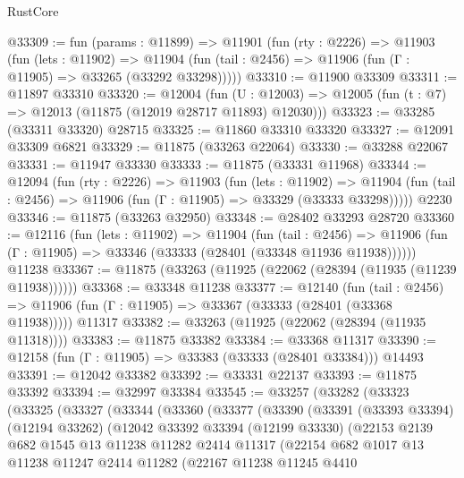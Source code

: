 \begin{lexlean}{RustCore}
\begin{coremodule}
@33309 := fun (params : @11899) =>
  @11901
    (fun (rty : @2226) =>
    @11903
      (fun (lets : @11902) =>
      @11904 (fun (tail : @2456) => @11906 (fun (Γ : @11905) => @33265 (@33292 @33298)))))
@33310 := @11900 @33309
@33311 := @11897 @33310
@33320 := @12004
    (fun (U : @12003) => @12005 (fun (t : @7) => @12013 (@11875 (@12019 @28717 @11893) @12030)))
@33323 := @33285 (@33311 @33320) @28715
@33325 := @11860 @33310 @33320
@33327 := @12091 @33309 @6821
@33329 := @11875 (@33263 @22064)
@33330 := @33288 @22067
@33331 := @11947 @33330
@33333 := @11875 (@33331 @11968)
@33344 := @12094
    (fun (rty : @2226) =>
    @11903
      (fun (lets : @11902) =>
      @11904 (fun (tail : @2456) => @11906 (fun (Γ : @11905) => @33329 (@33333 @33298)))))
    @2230
@33346 := @11875 (@33263 @32950)
@33348 := @28402 @33293 @28720
@33360 := @12116
    (fun (lets : @11902) =>
    @11904
      (fun (tail : @2456) =>
      @11906 (fun (Γ : @11905) => @33346 (@33333 (@28401 (@33348 @11936 @11938))))))
    @11238
@33367 := @11875 (@33263 (@11925 (@22062 (@28394 (@11935 (@11239 @11938))))))
@33368 := @33348 @11238
@33377 := @12140
    (fun (tail : @2456) => @11906 (fun (Γ : @11905) => @33367 (@33333 (@28401 (@33368 @11938)))))
    @11317
@33382 := @33263 (@11925 (@22062 (@28394 (@11935 @11318))))
@33383 := @11875 @33382
@33384 := @33368 @11317
@33390 := @12158 (fun (Γ : @11905) => @33383 (@33333 (@28401 @33384))) @14493
@33391 := @12042 @33382
@33392 := @33331 @22137
@33393 := @11875 @33392
@33394 := @32997 @33384
@33545 := @33257
    (@33282
      (@33323
        (@33325
          (@33327
            (@33344
              (@33360
                (@33377
                  (@33390
                    (@33391
                      (@33393 @33394)
                      (@12194 @33262)
                      (@12042
                        @33392
                        @33394
                        (@12199 @33330)
                        (@22153
                          @2139
                          @682
                          @1545
                          @13
                          @11238
                          @11282
                          @2414
                          @11317
                          (@22154
                            @682
                            @1017
                            @13
                            @11238
                            @11247
                            @2414
                            @11282
                            (@22167
                              @11238
                              @11245
                              @4410

\end{coremodule}
\end{lexlean}
